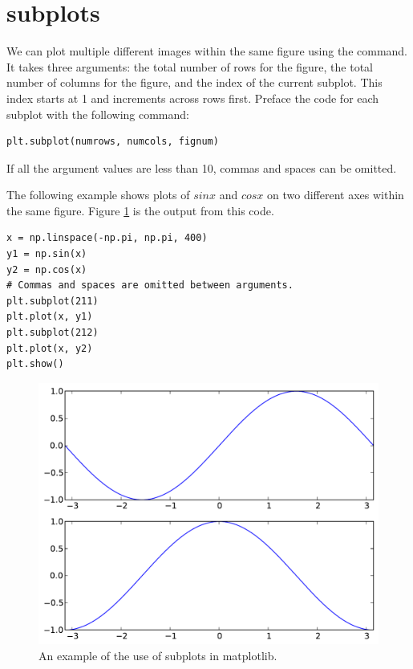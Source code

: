 \section*{subplots}

We can plot multiple different images within the same figure using the  command.
It takes three arguments: the total number of rows for the figure, the total number of columns for the figure, and the index of the current subplot.
This index starts at 1 and increments across rows first.
Preface the code for each subplot with the following command:
\begin{lstlisting}
plt.subplot(numrows, numcols, fignum)
\end{lstlisting}
If all the argument values are less than 10, commas and spaces can be omitted.

The following example shows plots of $sin x$ and $cos x$ on two different axes within the same figure.
Figure \ref{fig:subplots} is the output from this code.
\begin{lstlisting}
x = np.linspace(-np.pi, np.pi, 400)
y1 = np.sin(x)
y2 = np.cos(x)
# Commas and spaces are omitted between arguments.
plt.subplot(211)
plt.plot(x, y1)
plt.subplot(212)
plt.plot(x, y2)
plt.show()
\end{lstlisting}

\begin{figure}
\includegraphics[width=\textwidth]{subplots.pdf}
\caption{An example of the use of subplots in matplotlib.}
\label{fig:subplots}
\end{figure}

